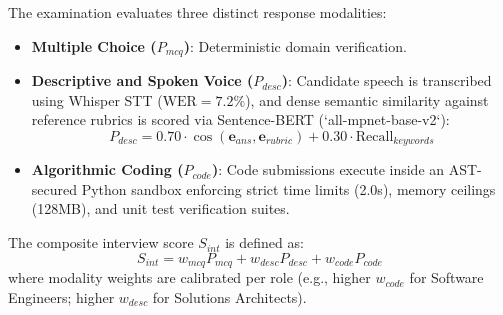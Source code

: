 \documentclass[conference]{IEEEtran}
\begin{document}
The examination evaluates three distinct response modalities:
\begin{itemize}
    \item \textbf{Multiple Choice ($P_{mcq}$)}: Deterministic domain verification.
    \item \textbf{Descriptive and Spoken Voice ($P_{desc}$)}: Candidate speech is transcribed using Whisper STT ($\text{WER}=7.2\%$), and dense semantic similarity against reference rubrics is scored via Sentence-BERT (`all-mpnet-base-v2`):
    \begin{equation}
    P_{desc} = 0.70 \cdot \cos(\mathbf{e}_{ans}, \mathbf{e}_{rubric}) + 0.30 \cdot \text{Recall}_{keywords}
    \end{equation}
    \item \textbf{Algorithmic Coding ($P_{code}$)}: Code submissions execute inside an AST-secured Python sandbox enforcing strict time limits (2.0s), memory ceilings (128MB), and unit test verification suites.
\end{itemize}
The composite interview score $S_{int}$ is defined as:
\begin{equation}
S_{int} = w_{mcq} P_{mcq} + w_{desc} P_{desc} + w_{code} P_{code}
\end{equation}
where modality weights are calibrated per role (e.g., higher $w_{code}$ for Software Engineers; higher $w_{desc}$ for Solutions Architects).
\end{document}
